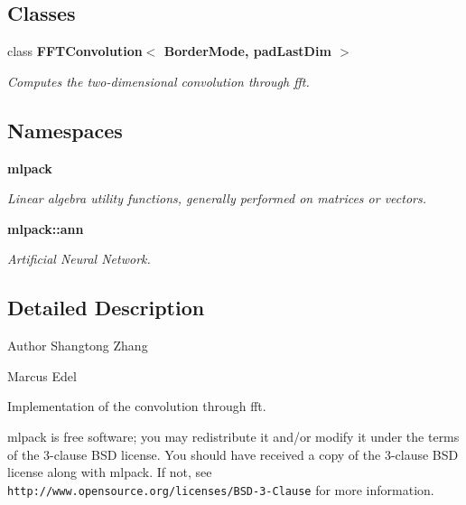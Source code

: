 \subsection*{Classes}
\begin{DoxyCompactItemize}
\item 
class \textbf{ F\+F\+T\+Convolution$<$ Border\+Mode, pad\+Last\+Dim $>$}
\begin{DoxyCompactList}\small\item\em Computes the two-\/dimensional convolution through fft. \end{DoxyCompactList}\end{DoxyCompactItemize}
\subsection*{Namespaces}
\begin{DoxyCompactItemize}
\item 
 \textbf{ mlpack}
\begin{DoxyCompactList}\small\item\em Linear algebra utility functions, generally performed on matrices or vectors. \end{DoxyCompactList}\item 
 \textbf{ mlpack\+::ann}
\begin{DoxyCompactList}\small\item\em Artificial Neural Network. \end{DoxyCompactList}\end{DoxyCompactItemize}


\subsection{Detailed Description}
\begin{DoxyAuthor}{Author}
Shangtong Zhang 

Marcus Edel
\end{DoxyAuthor}
Implementation of the convolution through fft.

mlpack is free software; you may redistribute it and/or modify it under the terms of the 3-\/clause B\+SD license. You should have received a copy of the 3-\/clause B\+SD license along with mlpack. If not, see {\tt http\+://www.\+opensource.\+org/licenses/\+B\+S\+D-\/3-\/\+Clause} for more information. 